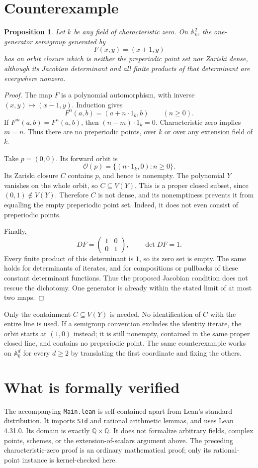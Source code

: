 \documentclass[11pt]{article}
\newtheorem{proposition}{Proposition}
\begin{document}
\section{Counterexample}
\begin{proposition}
Let $k$ be any field of characteristic zero. On $\mathbb A^2_k$, the
one-generator semigroup generated by
\[
 F(x,y)=(x+1,y)
\]
has an orbit closure which is neither the preperiodic point set nor Zariski
dense, although its Jacobian determinant and all finite products of that
determinant are everywhere nonzero.
\end{proposition}
\begin{proof}
The map $F$ is a polynomial automorphism, with inverse $(x,y)\mapsto(x-1,y)$.
Induction gives
\[
 F^n(a,b)=(a+n\cdot 1_k,b)\qquad(n\geq0).
\]
If $F^m(a,b)=F^n(a,b)$, then $(n-m)\cdot1_k=0$. Characteristic zero implies
$m=n$. Thus there are no preperiodic points, over $k$ or over any extension
field of $k$.

Take $p=(0,0)$. Its forward orbit is
\[
 \mathcal O(p)=\{(n\cdot1_k,0):n\geq0\}.
\]
Its Zariski closure $C$ contains $p$, and hence is nonempty. The polynomial
$Y$ vanishes on the whole orbit, so $C\subseteq V(Y)$. This is a proper
closed subset, since $(0,1)\notin V(Y)$. Therefore $C$ is not dense, and its
nonemptiness prevents it from equalling the empty preperiodic point set.
Indeed, it does not even consist of preperiodic points.

Finally,
\[
 DF=\begin{pmatrix}1&0\\0&1\end{pmatrix},\qquad \det DF=1.
\]
Every finite product of this determinant is $1$, so its zero set is empty.
The same holds for determinants of iterates, and for compositions or
pullbacks of these constant determinant functions. Thus the proposed
Jacobian condition does not rescue the dichotomy. One generator is already
within the stated limit of at most two maps.
\end{proof}

Only the containment $C\subseteq V(Y)$ is needed. No identification of $C$
with the entire line is used. If a semigroup convention excludes the
identity iterate, the orbit starts at $(1,0)$ instead; it is still nonempty,
contained in the same proper closed line, and contains no preperiodic point.
The same counterexample works on $\mathbb A^d_k$ for every $d\geq2$ by
translating the first coordinate and fixing the others.

\section{What is formally verified}
The accompanying \texttt{Main.lean} is self-contained apart from Lean's
standard distribution. It imports \texttt{Std} and rational arithmetic
lemmas, and uses Lean 4.31.0. Its domain is exactly
$\mathbb Q\times\mathbb Q$. It does not formalize arbitrary fields,
complex points, schemes, or the extension-of-scalars argument above.
The preceding characteristic-zero proof is an ordinary mathematical proof;
only its rational-point instance is kernel-checked here.
\end{document}
